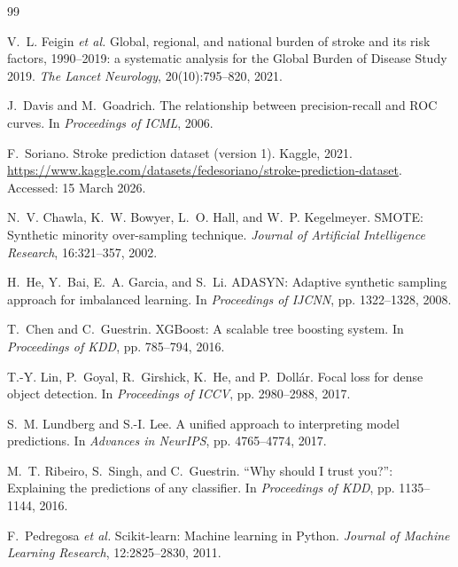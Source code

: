\documentclass[11pt,a4paper]{article}
\begin{document}
\begin{thebibliography}{99}

V.~L. Feigin \textit{et al.}
\newblock Global, regional, and national burden of stroke and its risk factors, 1990–2019: a systematic analysis for the Global Burden of Disease Study 2019.
\newblock \textit{The Lancet Neurology}, 20(10):795--820, 2021.

J.~Davis and M.~Goadrich.
\newblock The relationship between precision-recall and ROC curves.
\newblock In \textit{Proceedings of ICML}, 2006.

F.~Soriano.
\newblock Stroke prediction dataset (version 1).
\newblock Kaggle, 2021.
\newblock \url{https://www.kaggle.com/datasets/fedesoriano/stroke-prediction-dataset}.
\newblock Accessed: 15 March 2026.

N.~V. Chawla, K.~W. Bowyer, L.~O. Hall, and W.~P. Kegelmeyer.
\newblock SMOTE: Synthetic minority over-sampling technique.
\newblock \textit{Journal of Artificial Intelligence Research}, 16:321--357, 2002.

H.~He, Y.~Bai, E.~A. Garcia, and S.~Li.
\newblock ADASYN: Adaptive synthetic sampling approach for imbalanced learning.
\newblock In \textit{Proceedings of IJCNN}, pp. 1322--1328, 2008.

T.~Chen and C.~Guestrin.
\newblock XGBoost: A scalable tree boosting system.
\newblock In \textit{Proceedings of KDD}, pp. 785--794, 2016.

T.-Y. Lin, P.~Goyal, R.~Girshick, K.~He, and P.~Doll{\'a}r.
\newblock Focal loss for dense object detection.
\newblock In \textit{Proceedings of ICCV}, pp. 2980--2988, 2017.

S.~M. Lundberg and S.-I. Lee.
\newblock A unified approach to interpreting model predictions.
\newblock In \textit{Advances in NeurIPS}, pp. 4765--4774, 2017.

M.~T. Ribeiro, S.~Singh, and C.~Guestrin.
\newblock ``Why should I trust you?'': Explaining the predictions of any classifier.
\newblock In \textit{Proceedings of KDD}, pp. 1135--1144, 2016.

F.~Pedregosa \textit{et al.}
\newblock Scikit-learn: Machine learning in Python.
\newblock \textit{Journal of Machine Learning Research}, 12:2825--2830, 2011.

\end{thebibliography}
\end{document}

